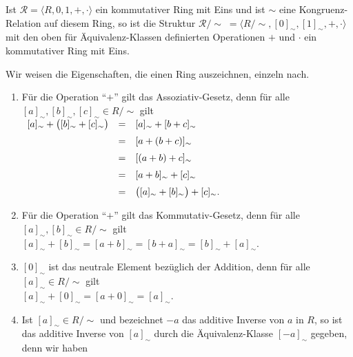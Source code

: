 \begin{Satz} \label{satz:faktor_ring} 
  Ist $\mathcal{R} = \langle R, 0, 1, +, \cdot \rangle$ ein kommutativer Ring mit Eins und ist
  $\sim$ eine Kongruenz-Relation auf diesem Ring, so ist die Struktur 
  $\mathcal{R}/\!\!\sim\; = \langle R/\!\sim, [0]_\sim, [1]_\sim, +, \cdot \rangle$
  mit den oben f\"{u}r \"{A}quivalenz-Klassen definierten Operationen $+$ und $\cdot$ ein kommutativer 
  Ring mit Eins.  
\end{Satz}

\proof
Wir weisen die Eigenschaften, die einen Ring auszeichnen, einzeln nach.
\begin{enumerate}
\item F\"{u}r die Operation ``$+$'' gilt das Assoziativ-Gesetz, denn f\"{u}r alle 
      $[a]_\sim, [b]_\sim, [c]_\sim \in R/\!\sim$ gilt
      \\[0.2cm]
      \hspace*{1.3cm}
      $
      \begin{array}[t]{lcl}
            [a]_\sim + \bigl([b]_\sim + [c]_\sim\bigr) 
      & = & [a]_\sim + [b + c]_\sim                     \\[0.2cm]
      & = & [a + (b + c)]_\sim                          \\[0.2cm]
      & = & [(a + b) + c]_\sim                          \\[0.2cm]
      & = & [a + b]_\sim + [c]_\sim                     \\[0.2cm]
      & = & \bigl([a]_\sim + [b]_\sim\bigr) + [c]_\sim. 
      \end{array}
      $
\item F\"{u}r die Operation ``$+$'' gilt das Kommutativ-Gesetz, denn f\"{u}r alle $[a]_\sim, [b]_\sim \in R/\!\sim$ gilt
      \\[0.2cm]
      \hspace*{1.3cm}
      $[a]_\sim + [b]_\sim = [a + b]_\sim = [b + a]_\sim = [b]_\sim + [a]_\sim$.
\item $[0]_\sim$ ist das neutrale Element bez\"{u}glich der Addition, denn f\"{u}r alle $[a]_\sim \in R/\!\sim$ gilt
      \\[0.2cm]
      \hspace*{1.3cm}
      $[a]_\sim + [0]_\sim = [a + 0]_\sim = [a]_\sim$.
\item Ist $[a]_\sim \in R/\!\sim$ und bezeichnet $-a$ das additive Inverse von $a$ in $R$, so ist das
      additive Inverse von  $[a]_\sim$ durch 
      die \"{A}quivalenz-Klasse $[-a]_\sim$ gegeben, denn wir haben

\end{enumerate}
